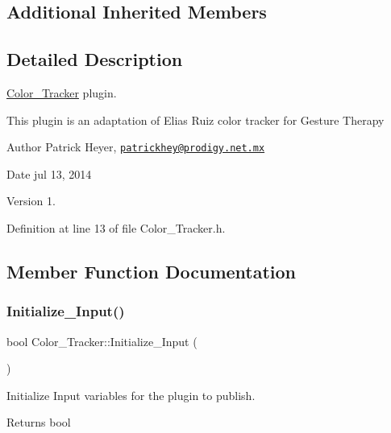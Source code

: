 \subsection*{Additional Inherited Members}


\subsection{Detailed Description}
\hyperlink{class_color___tracker}{Color\+\_\+\+Tracker} plugin. 

This plugin is an adaptation of Elias Ruiz color tracker for Gesture Therapy \begin{DoxyAuthor}{Author}
Patrick Heyer, \href{mailto:patrickhey@prodigy.net.mx}{\tt patrickhey@prodigy.\+net.\+mx} 
\end{DoxyAuthor}
\begin{DoxyDate}{Date}
jul 13, 2014 
\end{DoxyDate}
\begin{DoxyVersion}{Version}
1. 
\end{DoxyVersion}


Definition at line 13 of file Color\+\_\+\+Tracker.\+h.



\subsection{Member Function Documentation}
\mbox{\label{class_color___tracker_afc447223ab3c357e66530b08acd8daea}} 
\subsubsection{\texorpdfstring{Initialize\+\_\+\+Input()}{Initialize\_Input()}}
{\footnotesize\ttfamily bool Color\+\_\+\+Tracker\+::\+Initialize\+\_\+\+Input (\begin{DoxyParamCaption}{ }\end{DoxyParamCaption})\hspace{0.3cm}{\ttfamily [virtual]}}



Initialize Input variables for the plugin to publish. 

\begin{DoxyReturn}{Returns}
bool 
\end{DoxyReturn}


